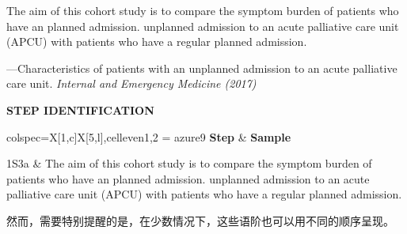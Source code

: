 \documentclass[a4paper]{ctexbook}
\begin{document}
\begin{sample}[label={myautocounter}]{\heiti}

  The aim of this cohort study is to compare the symptom burden of patients who have an planned admission. unplanned admission to an acute palliative care unit (APCU) with patients who have a regular planned admission.

  
  \begin{flushright}
    ---Characteristics of patients with an unplanned admission to an acute palliative care unit. \emph{Internal and Emergency Medicine (2017)}
  \end{flushright}

  \tcblower

  \noindent \textbf{STEP IDENTIFICATION}

  \vspace*{10pt}
  {\small\noindent
  \begin{tblr}{colspec={X[1,c]X[5,l]},cell{even}{1,2} = {azure9}}
    \toprule
    \textbf{Step} & \textbf{Sample} \\ 
    \midrule
    
    1S3a & The aim of this cohort study is to compare the symptom burden of patients who have an planned admission. unplanned admission to an acute palliative care unit (APCU) with patients who have a regular planned admission. \\
      
    \bottomrule
  \end{tblr}
  }

\end{sample}

然而，需要特别提醒的是，在少数情况下，这些语阶也可以用不同的顺序呈现。
\end{document}
